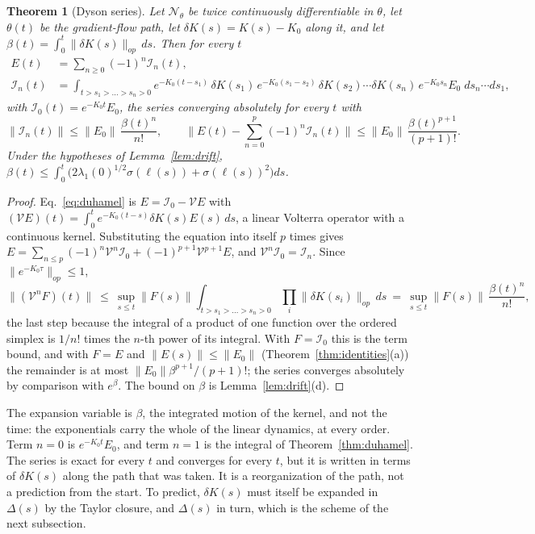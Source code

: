 \documentclass[11pt]{article}
\newtheorem{theorem}{Theorem}
\theoremstyle{definition}
\theoremstyle{remark}
\newcommand{\Net}{\mathcal{N}_\theta}    %
\begin{document}
\begin{theorem}[Dyson series]\label{thm:dyson}
Let $\Net$ be twice continuously differentiable in $\theta$, let $\theta(t)$ be the gradient-flow path, let $\delta K(s) = K(s) - K_0$ along it, and let $\beta(t) = \int_0^t\|\delta K(s)\|_{op}\,ds$.
Then for every $t$
\begin{equation}\label{eq:dyson}
\begin{aligned}
E(t) &= \sum_{n\ge0}(-1)^n\mathcal{I}_n(t),\\
\mathcal{I}_n(t) &= \int_{t > s_1 > \dots > s_n > 0}e^{-K_0(t - s_1)}\,\delta K(s_1)\,e^{-K_0(s_1 - s_2)}\,\delta K(s_2)\cdots\delta K(s_n)\,e^{-K_0s_n}E_0\;ds_n\cdots ds_1 ,
\end{aligned}
\end{equation}
with $\mathcal{I}_0(t) = e^{-K_0t}E_0$, the series converging absolutely for every $t$ with
\begin{equation}\label{eq:dysonbound}
\|\mathcal{I}_n(t)\|\le\|E_0\|\,\frac{\beta(t)^n}{n!},\qquad
\Big\|E(t) - \sum_{n = 0}^{p}(-1)^n\mathcal{I}_n(t)\Big\|\le\|E_0\|\,\frac{\beta(t)^{p+1}}{(p+1)!} .
\end{equation}
Under the hypotheses of Lemma~\ref{lem:drift}, $\beta(t)\le\int_0^t\big(2\lambda_1(0)^{1/2}\sigma(\ell(s)) + \sigma(\ell(s))^2\big)ds$.
\end{theorem}

\begin{proof}
Eq.~\eqref{eq:duhamel} is $E = \mathcal{I}_0 - \mathcal{V}E$ with $(\mathcal{V}E)(t) = \int_0^te^{-K_0(t-s)}\delta K(s)E(s)\,ds$, a linear Volterra operator with a continuous kernel.
Substituting the equation into itself $p$ times gives $E = \sum_{n\le p}(-1)^n\mathcal{V}^n\mathcal{I}_0 + (-1)^{p+1}\mathcal{V}^{p+1}E$, and $\mathcal{V}^n\mathcal{I}_0 = \mathcal{I}_n$.
Since $\|e^{-K_0\tau}\|_{op}\le1$,
\[
\|(\mathcal{V}^nF)(t)\|\ \le\ \sup_{s\le t}\|F(s)\|\int_{t>s_1>\dots>s_n>0}\prod_i\|\delta K(s_i)\|_{op}\,ds\ =\ \sup_{s\le t}\|F(s)\|\,\frac{\beta(t)^n}{n!},
\]
the last step because the integral of a product of one function over the ordered simplex is $1/n!$ times the $n$-th power of its integral.
With $F = \mathcal{I}_0$ this is the term bound, and with $F = E$ and $\|E(s)\|\le\|E_0\|$ (Theorem~\ref{thm:identities}(a)) the remainder is at most $\|E_0\|\beta^{p+1}/(p+1)!$; the series converges absolutely by comparison with $e^{\beta}$.
The bound on $\beta$ is Lemma~\ref{lem:drift}(d).
\end{proof}

The expansion variable is $\beta$, the integrated motion of the kernel, and not the time: the exponentials carry the whole of the linear dynamics, at every order.
Term $n = 0$ is $e^{-K_0t}E_0$, and term $n = 1$ is the integral of Theorem~\ref{thm:duhamel}.
The series is exact for every $t$ and converges for every $t$, but it is written in terms of $\delta K(s)$ along the path that was taken.
It is a reorganization of the path, not a prediction from the start.
To predict, $\delta K(s)$ must itself be expanded in $\Delta(s)$ by the Taylor closure, and $\Delta(s)$ in turn, which is the scheme of the next subsection.
\end{document}
